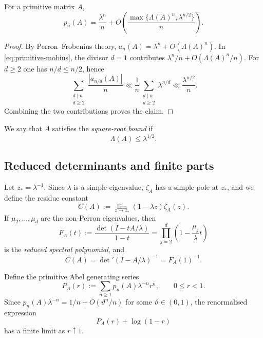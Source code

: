 \begin{lemma}\label{lem:primitive-orbit-asymptotic}\label{prop:prelim-prime-orbit}
For a primitive matrix \(A\),
\[
  p_n(A)=\frac{\lambda^n}{n}
  +O\!\left(\frac{\max\{\Lambda(A)^n,\lambda^{n/2}\}}{n}\right).
\]
\end{lemma}

\begin{proof}
By Perron--Frobenius theory,
\(
  a_n(A)=\lambda^n+O(\Lambda(A)^n)
\).
In \eqref{eq:primitive-mobius}, the divisor \(d=1\) contributes
\(\lambda^n/n+O(\Lambda(A)^n/n)\). For \(d\ge 2\) one has
\(n/d\le n/2\), hence
\[
  \sum_{\substack{d\mid n\\ d\ge 2}}\frac{|a_{n/d}(A)|}{n}
  \ll \frac{1}{n}\sum_{\substack{d\mid n\\ d\ge 2}}\lambda^{n/d}
  \ll \frac{\lambda^{n/2}}{n}.
\]
Combining the two contributions proves the claim.
\end{proof}

\begin{definition}\label{def:kernel-rh}
We say that \(A\) satisfies the \emph{square-root bound} if
\[
  \Lambda(A)\le \lambda^{1/2}.
\]
\end{definition}

\subsection{Reduced determinants and finite parts}

Let \(z_\ast=\lambda^{-1}\). Since \(\lambda\) is a simple eigenvalue,
\(\zeta_A\) has a simple pole at \(z_\ast\), and we define the residue
constant
\begin{equation}\label{eq:residue-constant-def}
  C(A):=\lim_{z\to z_\ast}(1-\lambda z)\zeta_A(z).
\end{equation}
If \(\mu_2,\dots,\mu_d\) are the non-Perron eigenvalues, then
\begin{equation}\label{eq:reduced-det-poly}
  F_A(t):=\frac{\det(I-tA/\lambda)}{1-t}
  =\prod_{j=2}^d\left(1-\frac{\mu_j}{\lambda}t\right)
\end{equation}
is the \emph{reduced spectral polynomial}, and
\begin{equation}\label{eq:reduced-det-constant}
  C(A)=\det\nolimits'(I-A/\lambda)^{-1}=F_A(1)^{-1}.
\end{equation}

Define the primitive Abel generating series
\[
  P_A(r):=\sum_{n\ge 1}p_n(A)\lambda^{-n}r^n,
  \qquad 0\le r<1.
\]
Since \(p_n(A)\lambda^{-n}=1/n+O(\vartheta^n/n)\) for some
\(\vartheta\in(0,1)\), the renormalised expression
\[
  P_A(r)+\log(1-r)
\]
has a finite limit as \(r\uparrow 1\).

